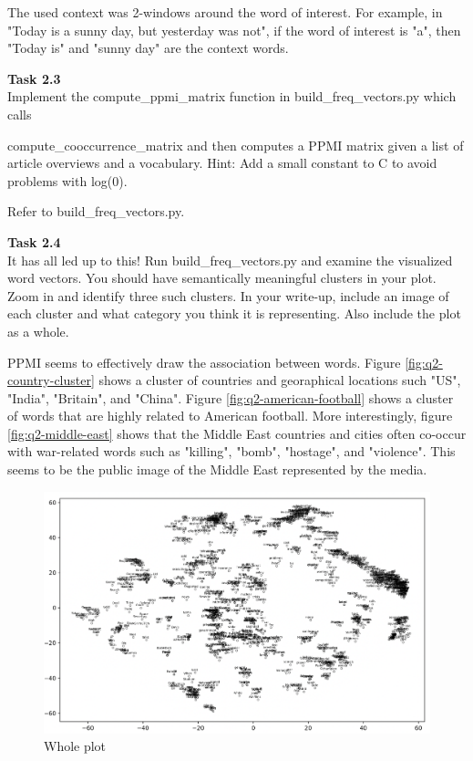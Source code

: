 \documentclass[12pt,article]{article}
\newenvironment{task}[2][Task]
    { \begin{mdframed}[backgroundcolor=gray!20] \textbf{#1 #2} \\}
    {  \end{mdframed}}
\begin{document}
The used context was 2-windows around the word of interest. For example, in "Today is a sunny day, but yesterday was not", if the word of interest is "a", then "Today is" and "sunny day" are the context words.

\begin{task}{2.3} 
Implement the compute\_ppmi\_matrix function in build\_freq\_vectors.py which calls 

compute\_cooccurrence\_matrix and then computes a PPMI matrix given a list of article overviews and a vocabulary. Hint: Add a small constant to C to avoid problems with log(0).
\end{task}

Refer to build\_freq\_vectors.py.
\newpage
\begin{task}{2.4} 
It has all led up to this! Run build\_freq\_vectors.py and examine the visualized word vectors. You should have semantically meaningful clusters in your plot. Zoom in and identify three such clusters. In your write-up, include an image of each cluster and what category you think it is representing. Also include the plot as a whole.
\end{task}

PPMI seems to effectively draw the association between words. Figure \ref{fig:q2-country-cluster} shows a cluster of countries and georaphical locations such "US", "India", "Britain", and "China". Figure \ref{fig:q2-american-football} shows a cluster of words that are highly related to American football. More interestingly, figure \ref{fig:q2-middle-east} shows that the Middle East countries and cities often co-occur with war-related words such as "killing", "bomb", "hostage", and "violence". This seems to be the public image of the Middle East represented by the media.

\begin{figure}[H]
    \centering
    \includegraphics[scale=0.5]{whole_plot.png} \par
    \caption{Whole plot}
    \label{fig:q2-overview}
\end{figure}
\end{document}
